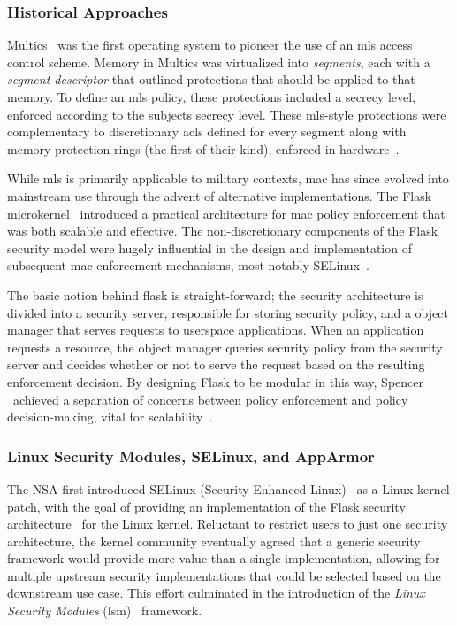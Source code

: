 \subsubsection*{Historical Approaches}

Multics~\cite{vyssotsky1965_multics, corbato1965_multics} was the first operating system
to pioneer the use of an \gls{mls} access control scheme. Memory in Multics was
virtualized into \textit{segments}, each with a \textit{segment descriptor} that outlined
protections that should be applied to that memory. To define an \gls{mls} policy, these
protections included a secrecy level, enforced according to the subjects secrecy level.
These \gls{mls}-style protections were complementary to discretionary \gls{acl}s defined
for every segment along with memory protection rings (the first of their kind), enforced
in hardware~\cite{jaeger2008_os_security}.

While \gls{mls} is primarily applicable to military contexts, \gls{mac} has since evolved
into mainstream use through the advent of alternative implementations. The Flask
microkernel~\cite{spencer1999_flask} introduced a practical architecture for \gls{mac}
policy enforcement that was both scalable and effective. The non-discretionary components
of the Flask security model were hugely influential in the design and implementation of
subsequent \gls{mac} enforcement mechanisms, most notably
SELinux~\cite{smalley2001_selinux, loscocco2001_selinux}.

The basic notion behind flask is straight-forward; the security architecture is divided
into a security server, responsible for storing security policy, and a object manager that
serves requests to userspace applications. When an application requests a resource, the
object manager queries security policy from the security server and decides whether or not
to serve the request based on the resulting enforcement decision. By designing Flask to be
modular in this way, Spencer \etal~achieved a separation of concerns between policy
enforcement and policy decision-making, vital for scalability~\cite{spencer1999_flask,
smalley2001_selinux, loscocco2001_selinux}.

\subsubsection*{Linux Security Modules, SELinux, and AppArmor}

The NSA first introduced SELinux (Security Enhanced Linux)~\cite{smalley2001_selinux,
loscocco2001_selinux} as a Linux kernel patch, with the goal of providing an
implementation of the Flask security architecture~\cite{spencer1999_flask} for the Linux
kernel. Reluctant to restrict users to just one security architecture, the kernel
community eventually agreed that a generic security framework would provide more value
than a single implementation, allowing for multiple upstream security implementations that
could be selected based on the downstream use case. This effort culminated in the
introduction of the \textit{Linux Security Modules} (\gls{lsm})~\cite{wright2002_lsm} framework.

